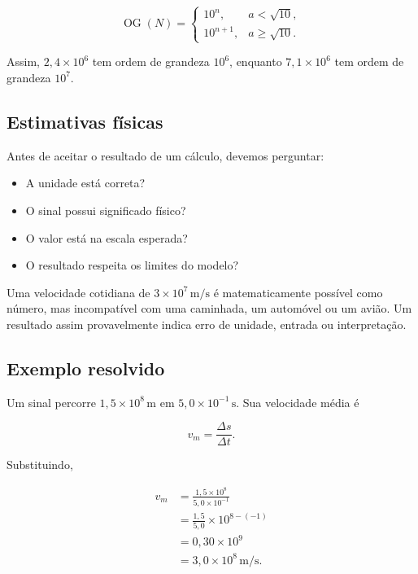 \begin{equation}
  \operatorname{OG}(N)=
  \begin{cases}
    10^n, & a<\sqrt{10},\\
    10^{n+1}, & a\geq\sqrt{10}.
  \end{cases}
\end{equation}

Assim, $2{,}4\times10^6$ tem ordem de grandeza $10^6$, enquanto $7{,}1\times10^6$ tem ordem de grandeza $10^7$.

\subsection{Estimativas físicas}

Antes de aceitar o resultado de um cálculo, devemos perguntar:

\begin{itemize}
  \item A unidade está correta?
  \item O sinal possui significado físico?
  \item O valor está na escala esperada?
  \item O resultado respeita os limites do modelo?
\end{itemize}

Uma velocidade cotidiana de $3\times10^7\,\si{\meter\per\second}$ é matematicamente possível como número, mas incompatível com uma caminhada, um automóvel ou um avião. Um resultado assim provavelmente indica erro de unidade, entrada ou interpretação.

\subsection*{Exemplo resolvido}

Um sinal percorre $1{,}5\times10^8\,\si{\meter}$ em $5{,}0\times10^{-1}\,\si{\second}$. Sua velocidade média é

\begin{equation}
  v_m=\frac{\Delta s}{\Delta t}.
\end{equation}

Substituindo,

\begin{align}
  v_m
  &=\frac{1{,}5\times10^8}{5{,}0\times10^{-1}}\\
  &=\frac{1{,}5}{5{,}0}\times10^{8-(-1)}\\
  &=0{,}30\times10^9\\
  &=3{,}0\times10^8\,\si{\meter\per\second}.
\end{align}

